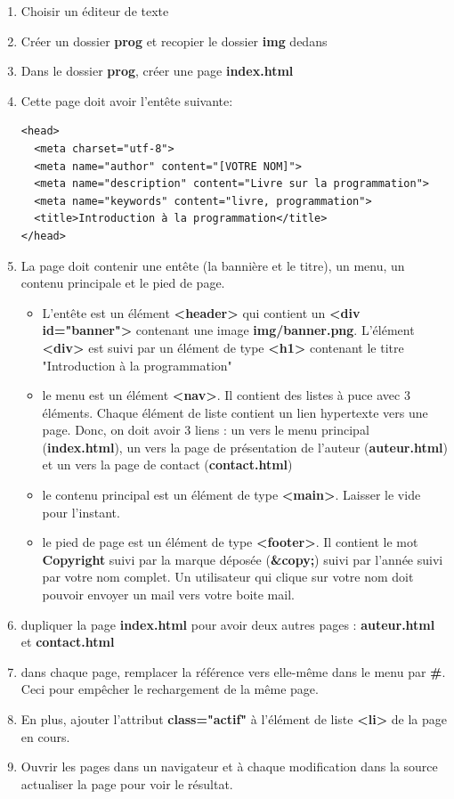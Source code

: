 \documentclass[11pt, a4paper]{article}
\begin{document}
\begin{enumerate}
	\item Choisir un éditeur de texte 
	\item Créer un dossier \textbf{prog} et recopier le dossier \textbf{img} dedans
	\item Dans le dossier \textbf{prog}, créer une page \textbf{index.html}
	\item Cette page doit avoir l'entête suivante: 
\begin{verbatim}
<head>
  <meta charset="utf-8">
  <meta name="author" content="[VOTRE NOM]">
  <meta name="description" content="Livre sur la programmation">
  <meta name="keywords" content="livre, programmation">
  <title>Introduction à la programmation</title>
</head>	
\end{verbatim}
	\item La page doit contenir une entête (la bannière et le titre), un menu, un contenu principale et le pied de page. 
	\begin{itemize}
		\item L'entête est un élément \textbf{<header>} qui contient un \textbf{<div id="banner">} contenant une image \textbf{img/banner.png}. 
		L'élément \textbf{<div>} est suivi par un élément de type \textbf{<h1>} contenant le titre "Introduction à la programmation"
		\item le menu est un élément \textbf{<nav>}. 
		Il contient des listes à puce avec 3 éléments. 
		Chaque élément de liste contient un lien hypertexte vers une page. 
		Donc, on doit avoir 3 liens : un vers le menu principal (\textbf{index.html}), 
		un vers la page de présentation de l'auteur (\textbf{auteur.html})
		et un vers la page de contact (\textbf{contact.html})
		\item le contenu principal est un élément de type \textbf{<main>}. 
		Laisser le vide pour l'instant.
		\item le pied de page est un élément de type \textbf{<footer>}. 
		Il contient le mot \textbf{Copyright} suivi par la marque déposée (\textbf{\&copy;}) suivi par l'année suivi par votre nom complet. 
		Un utilisateur qui clique sur votre nom doit pouvoir envoyer un mail vers votre boite mail.
	\end{itemize}
	
	\item dupliquer la page \textbf{index.html} pour avoir deux autres pages : \textbf{auteur.html} et \textbf{contact.html}
	\item dans chaque page, remplacer la référence vers elle-même dans le menu par \textbf{\#}. 
	Ceci pour empêcher le rechargement de la même page. 
	\item En plus, ajouter l'attribut \textbf{class="actif"} à l'élément de liste \textbf{<li>} de la page en cours.
	\item Ouvrir les pages dans un navigateur et à chaque modification dans la source actualiser la page pour voir le résultat.
	
\end{enumerate}
\end{document}
